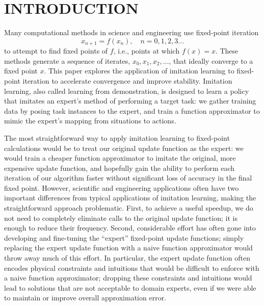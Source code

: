\documentclass[twoside,11pt]{article}
\begin{document}
\section{INTRODUCTION}


Many computational methods in science and engineering use fixed-point iteration
\[
x_{n+1} = f(x_n), \quad n = 0,1,2,3...
\]
to attempt to find fixed points of $f$, i.e., points at which $f(x)=x$. These methods generate a sequence of iterates, $x_0, x_1, x_2, \ldots$, that ideally converge to a fixed point $x$. This paper explores the application of imitation learning to fixed-point iteration to accelerate convergence and improve stability. Imitation learning, also called learning from demonstration, is designed to learn a policy that imitates an expert's method of performing a target task: we gather training data by posing task instances to the expert, and train a function approximator to mimic the expert's mapping from situations to actions.

The most straightforward way to apply imitation learning to fixed-point calculations would be to treat our original update function as the expert: we would train a cheaper function approximator to imitate the original, more expensive update function, and hopefully gain the ability to perform each iteration of our algorithm faster without significant loss of accuracy in the final fixed point.  
%
However, scientific and engineering applications often have two important differences from typical applications of imitation learning, making the straightforward approach problematic.  First, to achieve a useful speedup, we do not need to completely eliminate calls to the original update function; it is enough to reduce their frequency.  Second, considerable effort has often gone into developing and fine-tuning the ``expert'' fixed-point update functions; simply replacing the expert update function with a naive function approximator would throw away much of this effort.  In particular, the expert update function often encodes physical constraints and intuitions that would be difficult to enforce with a naive function approximator; dropping these constraints and intuitions would lead to solutions that are not acceptable to domain experts, even if we were able to maintain or improve overall approximation error.

\end{document}
